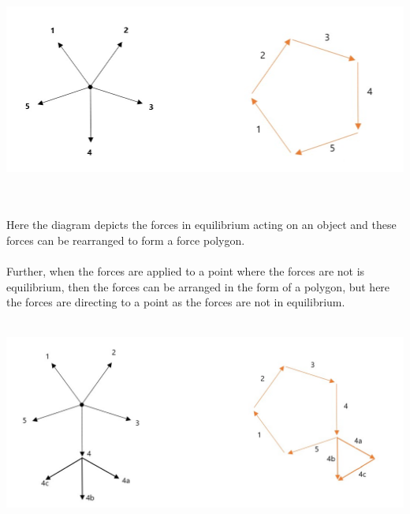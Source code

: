 \documentclass{article}
\begin{document}
    \\\\
    \centerline{\includegraphics[width=7in]{Images/forcegraph.png}}
    \\\\
    Here the diagram depicts the forces in equilibrium acting on an object and these forces can be rearranged to form a force polygon. 
    \\\\
    Further, when the forces are applied to a point where the forces are not is equilibrium, then the forces can be arranged in the form of a polygon, but here the forces are directing to a point as the forces are not in equilibrium.
    \\\\
    \centerline{\includegraphics[width=7in]{Images/forcegraphext.jpg}}
    \\\\
    
\end{document}
